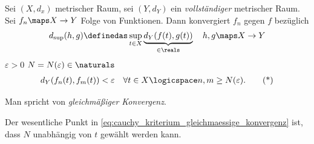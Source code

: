 \begin{lemma}\label{cauchy_kriterium_gleichmaessige_konvergenz}\hfill
    \begin{eigenschaftenenumerate}
        \item Sei \( (X,d_x)\) metrischer Raum, sei \( (Y,d_Y)\) ein \emph{vollständiger} metrischer Raum. Sei \( f_n\maps X\to Y\) Folge von Funktionen. Dann konvergiert \( f_n\) gegen \( f\) bezüglich
        \begin{align*}
            d_{\sup}(h,g)\definedas \sup_{t\in X} \underbrace {d_{Y}(f(t),g(t))}_{\in \reals } \quad h,g\maps X\to Y
        \end{align*}
        \tiff \tforall \( \varepsilon>0\) \texists \( N=N(\varepsilon)\in \naturals \) \sd
        \begin{align*}
            d_Y(f_n(t),f_m(t))<\varepsilon \quad \forall t\in X\logicspace n,m\geq N(\varepsilon).\tag{*}\label{eq:cauchy_kriterium_gleichmaessige_konvergenz}
        \end{align*} 
        \begin{notation*}
            Man spricht von \emph{gleichmäßiger Konvergenz}.
        \end{notation*}
         Der wesentliche Punkt in \eqref{eq:cauchy_kriterium_gleichmaessige_konvergenz} ist, dass \( N\) unabhängig von \( t\) gewählt werden kann.
        

\end{eigenschaftenenumerate}
\end{lemma}
